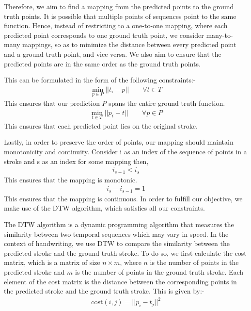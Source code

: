 \documentclass[10pt,twocolumn,letterpaper]{article}
\begin{document}

Therefore, we aim to find a mapping from the predicted points to the ground truth points. It is possible that multiple points of sequences point to the same function. Hence, instead of restricting to a one-to-one mapping, where each predicted point corresponds to one ground truth point, we consider many-to-many mappings, so as to minimize the distance between every predicted point and a ground truth point, and vice versa. We also aim to ensure that the predicted points are in the same order as the ground truth points.

This can be formulated in the form of the following constraints:-
\begin{align}
\min_{p \in P} || t_i - p ||   \qquad   \forall t \in T
\end{align}
This ensures that our prediction $P$ spans the entire ground truth function.
\begin{align}
  \min_{t \in T} || p_i - t ||  \qquad  \forall p \in P
\end{align}
This ensures that each predicted point lies on the original stroke.

Lastly, in order to preserve the order of points, our mapping should maintain monotonicity and continuity.
Consider {i} as an index of the sequence of points in a stroke and {s} as an index for some mapping then,
\begin{align}
  i_{s-1} < i_s 
\end{align}
This ensures that the mapping is monotonic.
\begin{align}
 i_s - i_{s-1} = 1
\end{align}
This ensures that the mapping is continuous.
\newline 
In order to fulfill our objective, we make use of the DTW algorithm, which satisfies all our constraints.

The DTW algorithm is a dynamic programming algorithm that measures the similarity between two temporal sequences which may vary in speed. In the context of handwriting, we use DTW to compare the similarity between the predicted stroke and the ground truth stroke.
To do so, we first calculate the cost matrix, which is a matrix of size $n \times m$, where $n$ is the number of points in the predicted stroke and $m$ is the number of points in the ground truth stroke. Each element of the cost matrix is the distance between the corresponding points in the predicted stroke and the ground truth stroke. 
This is given by:-
\begin{align}
    \text{cost}(i, j) = ||p_i - t_j||^2
\end{align}
\end{document}
